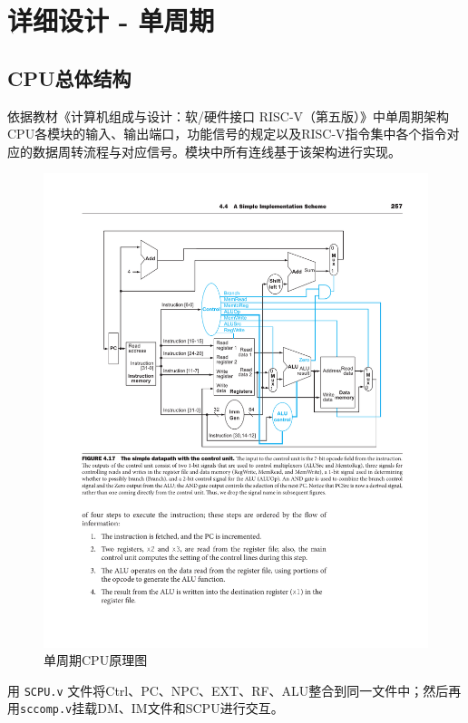 \documentclass[UTF8,a4paper,autofakebold,15pt]{ctexart}
\begin{document}
\newpage

\section{详细设计 - 单周期}

\subsection{CPU总体结构}

依据教材《计算机组成与设计：软/硬件接口 RISC-V（第五版）》\cite{ref1}中单周期架构CPU各模块的输入、输出端口，功能信号的规定以及RISC-V指令集中各个指令对应的数据周转流程与对应信号。模块中所有连线基于该架构进行实现。

\begin{figure}[ht]
	\centering
	\includegraphics{fig2.pdf}
	\caption{单周期CPU原理图\cite{ref1}}
	\label{fig:label2}
\end{figure}

用 {\tt SCPU.v} 文件将Ctrl、PC、NPC、EXT、RF、ALU整合到同一文件中；然后再用{\tt sccomp.v}挂载DM、IM文件和SCPU进行交互。
\end{document}
